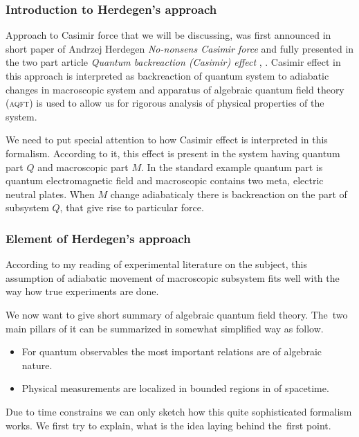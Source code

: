 \documentclass[10pt,t]{beamer}
\begin{document}
\begin{frame}
  \frametitle{Introduction to Herdegen's approach}


  Approach to Casimir force that we will be discussing, was first announced
  in short paper of Andrzej Herdegen \textit{No-nonsens Casimir force}
  \parencite{Herdegen-Nononsens-Casimir-force-Pub-2001} and fully presented
  in the two part article \textit{Quantum backreaction (Casimir) effect}
  \parencite{Herdegen-Quantum-backreaction-ETC-Part-I-Pub-2005},
  \parencite{Herdegen-Quantum-backreaction-ETC-Part-II-Pub-2006}. Casimir
  effect in this approach is interpreted as backreaction of quantum system
  to adiabatic changes in macroscopic system and apparatus of algebraic
  quantum field theory (\textsc{aqft}) is used to allow us for rigorous
  analysis of physical properties of the system.

  We need to put special attention to how Casimir effect is interpreted
  in this formalism. According to it, this effect is present in the system
  having quantum part $Q$ and macroscopic part $M$. In the standard example
  quantum part is quantum electromagnetic field and macroscopic contains
  two meta, electric neutral plates. When $M$ change \alert{adiabaticaly}
  there is backreaction on the part of subsystem $Q$, that give rise to
  particular force.

\end{frame}





\begin{frame}
  \frametitle{Element of Herdegen's approach}


  According to my reading of experimental literature on the subject,
  this assumption of adiabatic movement of macroscopic subsystem fits
  well with the way how true experiments are done.

  We now want to give short summary of algebraic quantum field theory.
  The~two main pillars of it can be summarized in somewhat simplified way as
  follow.
  \begin{itemize}

  \item For quantum observables the most important relations are of
    algebraic nature.

  \item Physical measurements are localized in bounded regions in of
    spacetime.

  \end{itemize}
  Due to time constrains we can only sketch how this quite sophisticated
  formalism works. We first try to explain, what is the idea laying behind
  the~first point.

\end{frame}
\end{document}
